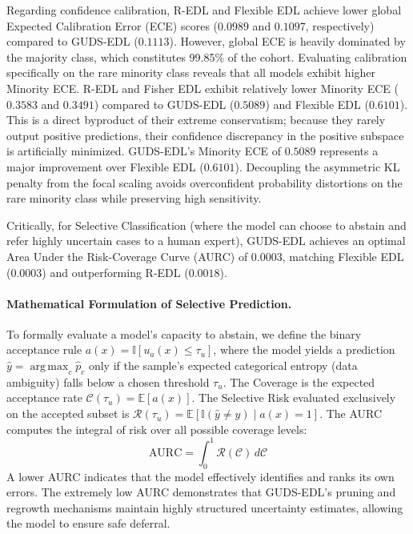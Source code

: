 \documentclass[letterpaper]{article} %
\newcommand{\E}{\mathbb{E}}
\DeclareMathOperator*{\argmax}{arg\,max}
\begin{document}
Regarding confidence calibration, R-EDL and Flexible EDL achieve lower global Expected Calibration Error (ECE) scores ($0.0989$ and $0.1097$, respectively) compared to GUDS-EDL ($0.1113$). However, global ECE is heavily dominated by the majority class, which constitutes 99.85\% of the cohort. Evaluating calibration specifically on the rare minority class reveals that all models exhibit higher Minority ECE. R-EDL and Fisher EDL exhibit relatively lower Minority ECE ($0.3583$ and $0.3491$) compared to GUDS-EDL ($0.5089$) and Flexible EDL ($0.6101$). This is a direct byproduct of their extreme conservatism; because they rarely output positive predictions, their confidence discrepancy in the positive subspace is artificially minimized. GUDS-EDL's Minority ECE of $0.5089$ represents a major improvement over Flexible EDL ($0.6101$). Decoupling the asymmetric KL penalty from the focal scaling avoids overconfident probability distortions on the rare minority class while preserving high sensitivity.

Critically, for Selective Classification (where the model can choose to abstain and refer highly uncertain cases to a human expert), GUDS-EDL achieves an optimal Area Under the Risk-Coverage Curve (AURC) of $\mathbf{0.0003}$, matching Flexible EDL ($0.0003$) and outperforming R-EDL ($0.0018$).

\paragraph{Mathematical Formulation of Selective Prediction.} To formally evaluate a model's capacity to abstain, we define the binary acceptance rule $a(x) = \mathbb{I}[u_a(x) \le \tau_u]$, where the model yields a prediction $\hat{y} = \argmax_c \hat{p}_c$ only if the sample's expected categorical entropy (data ambiguity) falls below a chosen threshold $\tau_u$. The Coverage is the expected acceptance rate $\mathcal{C}(\tau_u) = \E[a(x)]$. The Selective Risk evaluated exclusively on the accepted subset is $\mathcal{R}(\tau_u) = \E[\mathbb{I}(\hat{y} \ne y) \mid a(x) = 1]$. The AURC computes the integral of risk over all possible coverage levels:
\begin{equation}
    \text{AURC} = \int_0^1 \mathcal{R}(\mathcal{C}) \, d\mathcal{C}
\end{equation}
A lower AURC indicates that the model effectively identifies and ranks its own errors. The extremely low AURC demonstrates that GUDS-EDL's pruning and regrowth mechanisms maintain highly structured uncertainty estimates, allowing the model to ensure safe deferral.
\end{document}
